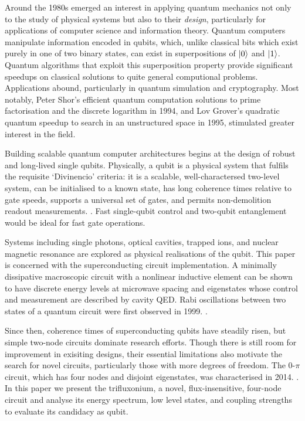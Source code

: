 \documentclass[11pt]{article}
\begin{document}
Around the 1980s emerged an interest in applying quantum mechanics not only to the study of physical systems but also to their \emph{design}, particularly for applications of computer science and information theory. Quantum computers manipulate information encoded in qubits, which, unlike classical bits which exist purely in one of two binary states, can exist in superpositions of $\ket{0}$ and $\ket{1}$. Quantum algorithms that exploit this superposition property provide significant speedups on classical solutions to quite general computional problems. Applications abound, particularly in quantum simulation and cryptography. Most notably, Peter Shor's efficient quantum computation solutions to prime factorisation and the discrete logarithm in 1994, and Lov Grover's quadratic quantum speedup to search in an unstructured space in 1995, stimulated greater interest in the field.

Building scalable quantum computer architectures begins at the design of robust and long-lived single qubits. Physically, a qubit is a physical system that fulfils the requisite `Divinencio' criteria: it is a scalable, well-charactersed two-level system, can be initialised to a known state, has long coherence times relative to gate speeds, supports a universal set of gates, and permits non-demolition readout measurements. \cite{divincenzo2000physical}. Fast  single-qubit control and two-qubit entanglement would be ideal for fast gate operations.

Systems including single photons, optical cavities, trapped ions, and nuclear magnetic resonance are explored as physical realisations of the qubit. This paper is concerned with the superconducting circuit implementation. A minimally dissipative macroscopic circuit with a nonlinear inductive element can be shown to have discrete energy levels at microwave spacing and eigenstates whose control and measurement are described by cavity QED. Rabi oscillations between two states of a quantum circuit were first observed in 1999. \cite{nakamura1999coherent}.

Since then, coherence times of superconducting qubits have steadily risen, but simple two-node circuits dominate research efforts. Though there is still room for improvement in exisiting designs, their essential limitations also motivate the search for novel circuits, particularly those with more degrees of freedom. The $0$-$\pi$ circuit, which has four nodes and disjoint eigenstates, was characterised in 2014. \cite{dempster2014understanding}. In this paper we present the trifluxonium, a novel, flux-insensitive, four-node circuit and analyse its energy spectrum, low level states, and coupling strengths to evaluate its candidacy as qubit.
\end{document}
